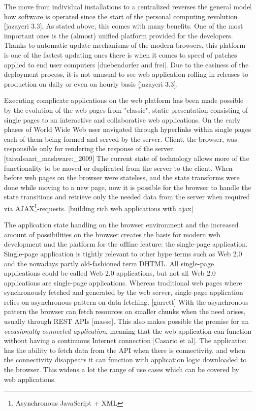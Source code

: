 The move from individual installations to a centralized reverses the general model how software is operated since the start of the personal computing revolution [jazayeri 3.3]. As stated above, this comes with many benefits. One of the most important ones is the (almost) unified platform provided for the developers. Thanks to automatic update mechanisms of the modern browsers, this platform is one of the fastest updating ones there is when it comes to speed of patches applied to end user computers [duebendorfer and frei]. Due to the easiness of the deployment process, it is not unusual to see web application rolling in releases to production on daily or even on hourly basis [jazayeri 3.3].

Executing complicate applications on the web platform has been made possible by the evolution of the web pages from "classic", static presentation consisting of single pages to an interactive and collaborative web applications. On the early phases of World Wide Web user navigated through hyperlinks within single pages each of them being formed and served by the server. Client, the browser, was responsible only for rendering the response of the server. [taivalsaari_mashware:_2009] The current state of technology allows more of the functionality to be moved or duplicated from the server to the client. When before web pages on the browser were stateless, and the state transforms were done while moving to a new page, now it is possible for the browser to handle the state transitions and retrieve only the needed data from the server when required via AJAX\footnote{Asynchronous JavaScript + XML}-requests. [building rich web applications with ajax] 

The application state handling on the browser environment and the increased amount of possibilities on the browser creates the basis for modern web development and the platform for the offline feature: the single-page application. Single-page application is tightly relevant to other hype terms such as Web 2.0 and the nowadays partly old-fashioned term DHTML. All single-page applications could be called Web 2.0 applications, but not all Web 2.0 applications are single-page applications. Whereas traditional web pages where synchronously fetched and generated by the web server, single-page application relies on asynchronous pattern on data fetching. [garrett] With the asynchronous pattern the browser can fetch resources on smaller chunks when the need arises, usually through REST APIs [masse]. This also makes possible the premise for an \textit{occasionally connected application}, meaning that the web application can function without having a continuous Internet connection [Casario et al]. The application has the ability to fetch data from the API when there is connectivity, and when the connectivity disappears it can function with application logic downloaded to the browser.  This widens a lot the range of use cases which can be covered by web applications.



